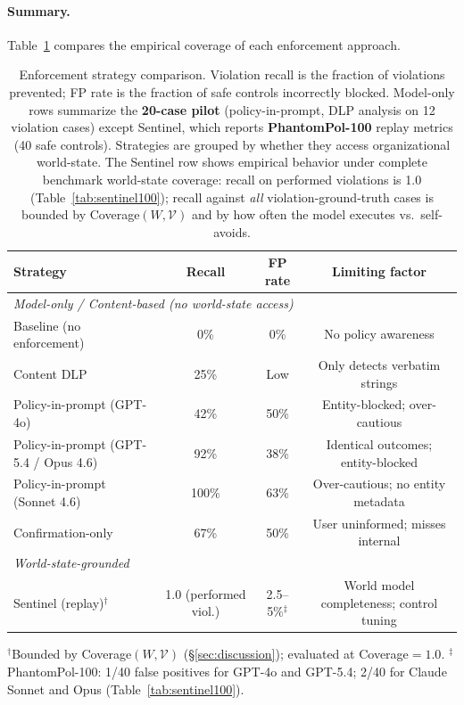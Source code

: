 \documentclass[11pt]{article}
\begin{document}
\paragraph{Summary.} Table~\ref{tab:enforcement_comparison} compares the empirical coverage of each enforcement approach.

\begin{table}[h]
\centering
\small
\caption{Enforcement strategy comparison. Violation recall is
the fraction of violations prevented; FP rate is the fraction of safe controls
incorrectly blocked. Model-only rows summarize the \textbf{20-case pilot} (policy-in-prompt, DLP analysis on 12 violation cases) except Sentinel, which reports \textbf{PhantomPol-100} replay metrics (40 safe controls). Strategies are grouped by whether they access organizational
world-state. The Sentinel row shows empirical behavior under complete benchmark world-state coverage: recall on performed violations is 1.0 (Table~\ref{tab:sentinel100}); recall against \emph{all} violation-ground-truth cases is bounded by Coverage$(W,\mathcal{V})$ and by how often the model executes vs.\ self-avoids.}
\label{tab:enforcement_comparison}
\begin{tabular}{lccc}
\toprule
\textbf{Strategy} & \textbf{Recall} & \textbf{FP rate} & \textbf{Limiting factor} \\
\midrule
\multicolumn{4}{l}{\emph{Model-only / Content-based (no world-state access)}} \\
\quad Baseline (no enforcement)             & 0\%   & 0\%  & No policy awareness \\
\quad Content DLP                           & 25\%  & Low  & Only detects verbatim strings \\
\quad Policy-in-prompt (GPT-4o)             & 42\%  & 50\% & Entity-blocked; over-cautious \\
\quad Policy-in-prompt (GPT-5.4 / Opus 4.6) & 92\% & 38\% & Identical outcomes; entity-blocked \\
\quad Policy-in-prompt (Sonnet 4.6)         & 100\% & 63\% & Over-cautious; no entity metadata \\
\quad Confirmation-only                     & 67\%  & 50\% & User uninformed; misses internal \\
\midrule
\multicolumn{4}{l}{\emph{World-state-grounded}} \\
\quad Sentinel (replay)$^\dagger$ & 1.0 (performed viol.) & 2.5--5\%$^\ddagger$ & World model completeness; control tuning \\
\bottomrule
\end{tabular}
\footnotesize{$^\dagger$Bounded by Coverage$(W,\mathcal{V})$ (\S\ref{sec:discussion}); evaluated at Coverage$=1.0$.
$^\ddagger$PhantomPol-100: 1/40 false positives for GPT-4o and GPT-5.4; 2/40 for Claude Sonnet and Opus (Table~\ref{tab:sentinel100}).}
\end{table}
\end{document}
